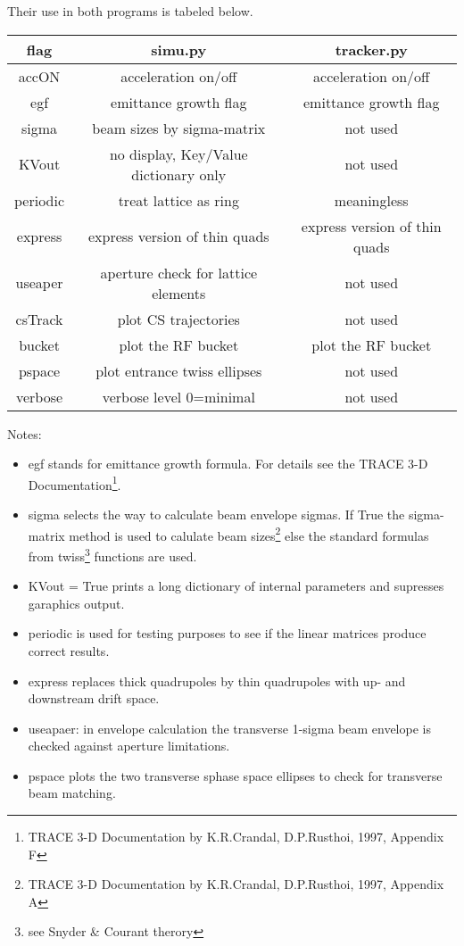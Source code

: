 \documentclass[10pt]{article}
\begin{document}
Their use in both programs is tabeled below.
\begin{center}
\begin{tabular}{c|c|c}
flag & simu.py & tracker.py \\ \hline
\hline
accON & acceleration on/off & acceleration on/off \\
\hline
egf & emittance growth flag & emittance growth flag \\
\hline
sigma & beam sizes by sigma-matrix & not used\\
\hline
KVout & no display, Key/Value dictionary only& not used \\
\hline
periodic & treat lattice as ring & meaningless \\
\hline
express & express version of thin quads & express version of thin quads \\
\hline
useaper & aperture check for lattice elements & not used\\
\hline
csTrack & plot CS trajectories & not used \\
\hline
bucket & plot the RF bucket & plot the RF bucket  \\
\hline
pspace & plot entrance twiss ellipses & not used \\
\hline
verbose & verbose level 0=minimal& not used \\
\hline
\end{tabular}
\end{center}
Notes:
\begin{itemize}
\item egf stands for emittance growth formula. For details see the TRACE 3-D Documentation\footnote{TRACE 3-D Documentation by K.R.Crandal, D.P.Rusthoi, 1997, Appendix F}.
\item sigma selects the way to calculate beam envelope sigmas. If True the sigma-matrix
method is used to calulate beam sizes\footnote{TRACE 3-D Documentation by K.R.Crandal, D.P.Rusthoi, 1997, Appendix A} else the standard formulas from twiss\footnote{see Snyder \& Courant therory} functions are used.
\item KVout = True prints a long dictionary of internal parameters and supresses garaphics output.
\item periodic is used for testing purposes to see if the linear matrices produce correct results.
\item express replaces thick quadrupoles by thin quadrupoles with up- and downstream 
drift space.
\item useapaer: in envelope calculation the transverse 1-sigma beam envelope is checked against aperture limitations.
\item pspace plots the two transverse sphase space ellipses to check for transverse beam matching.
\end{itemize}
\end{document}
